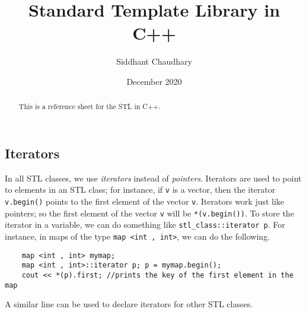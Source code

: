 \documentclass[12pt,a4paper]{amsart}
\numberwithin{equation}{section}
\theoremstyle{definition}
\begin{document}
\title{Standard Template Library in C++}
\author{Siddhant Chaudhary}
\date{December 2020}

\maketitle
    
\begin{abstract}
This is a reference sheet for the STL in C++.
\end{abstract}
    
\tableofcontents

\subsection{Iterators} In all STL classes, we use \textit{iterators} instead of \textit{pointers}. Iterators are used to point to elements in an STL class; for instance, if \verb|v| is a vector, then the iterator \verb|v.begin()| points to the first element of the vector \verb|v|. Iterators work just like pointers; so the first element of the vector \verb|v| will be \verb|*(v.begin())|. To store the iterator in a variable, we can do something like \verb|stl_class::iterator p|. For instance, in maps of the type \verb|map <int , int>|, we can do the following.  
\begin{lstlisting}
    map <int , int> mymap;
    map <int , int>::iterator p; p = mymap.begin();
    cout << *(p).first; //prints the key of the first element in the map
\end{lstlisting}
A similar line can be used to declare iterators for other STL classes.
\end{document}
